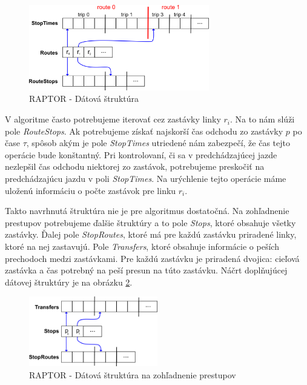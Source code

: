 \begin{figure}[H]
\centerline{\includegraphics[width=0.7\textwidth]{images/raptor-structure}}
\caption[RAPTOR - Dátová štruktúra]{RAPTOR - Dátová štruktúra}
\label{fig:raptor-structure}
\end{figure}

V algoritme často potrebujeme iterovať cez zastávky linky $r_i$. Na to nám slúži pole \textit{RouteStops}. Ak potrebujeme získať najskorší čas odchodu zo zastávky $p$ po čase $\tau$, spôsob akým je pole \textit{StopTimes} utriedené nám zabezpečí, že čas tejto operácie bude konštantný.
Pri kontrolovaní, či sa v predchádzajúcej jazde nezlepšil čas odchodu niektorej zo zastávok, potrebujeme preskočiť na predchádzajúcu jazdu v poli \textit{StopTimes}. Na urýchlenie tejto operácie máme uloženú informáciu o počte zastávok pre linku $r_i$.

Takto navrhnutá štruktúra nie je pre algoritmus dostatočná. Na zohľadnenie prestupov potrebujeme ďalšie štruktúry a to pole \textit{Stops}, ktoré obsahuje všetky zastávky. Ďalej pole \textit{StopRoutes}, ktoré má pre každú zastávku priradené linky, ktoré na nej zastavujú. Pole \textit{Transfers}, ktoré obsahuje informácie o peších prechodoch medzi zastávkami. Pre každú zastávku je priradená dvojica: cieľová zastávka a čas potrebný na peší presun na túto zastávku. Náčrt doplňujúcej dátovej štruktúry je na obrázku \ref{fig:raptor-structure2}.

\begin{figure}[H]
\centerline{\includegraphics[width=0.5\textwidth]{images/raptor-structure2}}
\caption[RAPTOR - Dátová štruktúra na zohľadnenie prestupov]{RAPTOR - Dátová štruktúra na zohľadnenie prestupov}
\label{fig:raptor-structure2}
\end{figure}

